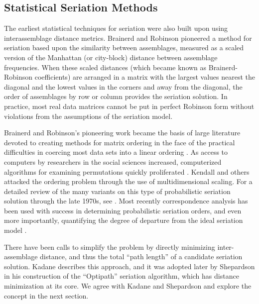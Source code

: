 \subsection{Statistical Seriation
Methods}\label{statistical-seriation-methods}

The earliest statistical techniques for seriation were also built upon
using interassemblage distance metrics. Brainerd \citeyearpar{Brainerd1951} and Robinson
\citeyearpar{Robinson1951} pioneered a method for seriation
based upon the similarity between assemblages, measured as a scaled
version of the Manhattan (or city-block) distance between assemblage
frequencies. When these scaled distances (which became known as
Brainerd-Robinson coefficients) are arranged in a matrix with the
largest values nearest the diagonal and the lowest values in the corners
and away from the diagonal, the order of assemblages by row or column
provides the seriation solution. In practice, most real data matrices
cannot be put in perfect Robinson form without violations from the
assumptions of the seriation model.

Brainerd and Robinson's pioneering work became the basis of large literature
devoted to creating methods for matrix ordering in the face of the
practical difficulties in coercing most data sets into a linear
ordering
\citep[e.g.,][]{dempsey1963statistical, Kendall1963, Matthews1963, Bordaz1970aa, Gardin1970, Kendall1970, Kendall1971}.
As access to computers by researchers in the social sciences increased,
computerized algorithms for examining permutations quickly proliferated
\citep{Ascher1963, craytor1968refinements, Kuzara1966}. Kendall
\citeyearpar{Kendall1969} and others attacked the ordering problem
through the use of multidimensional scaling. For a detailed review of
the many variants on this type of probabilistic seriation solution
through the late 1970s, see \citep{Marquardt:1978aa}. Most recently
correspondence analysis has been used with success in determining
probabilistic seriation orders, and even more importantly, quantifying the
degree of departure from the ideal seriation model \citep{Smith2005}.

There have been calls to simplify
the problem by directly minimizing inter-assemblage distance, and thus
the total ``path length'' of a candidate seriation solution.  Kadane
\citeyearpar{Kadane1971} describes this approach, and it was adopted
later by Shepardson \citeyearpar{shepardson2006} in his construction of
the ``Optipath'' seriation algorithm, which has distance minimization at
its core.  We agree with Kadane and Shepardson and explore the concept in the next section.

